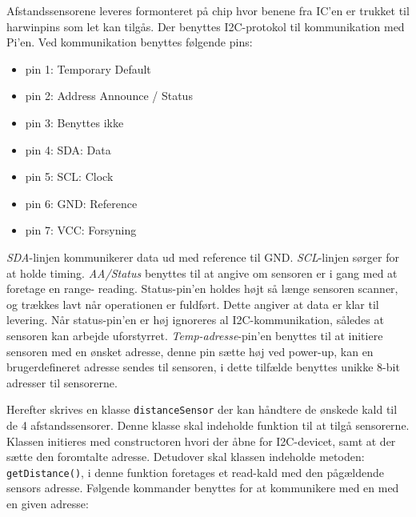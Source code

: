 
Afstandssensorene leveres formonteret på chip hvor benene fra IC'en er trukket til harwinpins som let kan tilgås. Der benyttes I2C-protokol til kommunikation med Pi'en. Ved kommunikation benyttes følgende pins: 

\begin{itemize}
	\item pin 1: Temporary Default
	\item pin 2: Address Announce / Status
	\item pin 3: Benyttes ikke
	\item pin 4: SDA: Data
	\item pin 5: SCL: Clock
	\item pin 6: GND: Reference
	\item pin 7: VCC: Forsyning
\end{itemize}

\noindent
\textit{SDA}-linjen kommunikerer data ud med reference til GND.
\noindent
\textit{SCL}-linjen sørger for at holde timing. 
\noindent
\textit{AA/Status} benyttes til at angive om sensoren er i gang med at foretage en range- reading. Status-pin'en holdes højt så længe sensoren scanner, og trækkes lavt når operationen er fuldført. Dette angiver at data er klar til levering. Når status-pin'en er høj ignoreres al I2C-kommunikation, således at sensoren kan arbejde uforstyrret. 
\noindent
\textit{Temp-adresse}-pin'en benyttes til at initiere sensoren med en ønsket adresse, denne pin sætte høj ved power-up, kan en brugerdefineret adresse sendes til sensoren, i dette tilfælde benyttes unikke 8-bit adresser til sensorerne.

Herefter skrives en klasse \texttt{distanceSensor} der kan håndtere de ønskede kald til de 4 afstandssensorer. 
Denne klasse skal indeholde funktion til at tilgå sensorerne. Klassen initieres med constructoren hvori der åbne for I2C-devicet, samt at der sætte den foromtalte adresse. Detudover skal klassen indeholde metoden: \texttt{getDistance()}, i denne funktion foretages et read-kald med den pågældende sensors adresse. 
Følgende kommander benyttes for at kommunikere med en med en given adresse: 











\clearpage